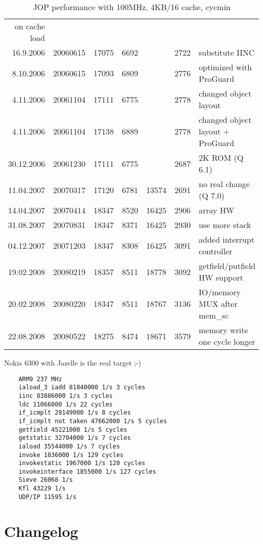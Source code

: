 \documentclass[a4paper,12pt]{scrartcl}
\begin{document}
\begin{table}
\begin{tabular}{rrrrrrl}
        on cache load\\
        16.9.2006 & 20060615 & 17075 & 6692 & & 2722 & substitute
        IINC\\
        8.10.2006 & 20060615 & 17093 & 6809 & & 2776 & optimized
        with ProGuard\\
        4.11.2006 & 20061104 & 17111 & 6775 & & 2778 & changed
        object layout\\
        4.11.2006 & 20061104 & 17138 & 6889 & & 2778 & changed
        object layout + ProGuard\\
        30.12.2006 & 20061230 & 17111 & 6775 & & 2687 & 2K ROM (Q 6.1)\\
        11.04.2007 & 20070317 & 17120 & 6781 & 13574 & 2691 & no real
        change (Q 7.0)\\
        14.04.2007 & 20070414 & 18347 & 8520 & 16425 & 2906 & array HW \\
        31.08.2007 & 20070831 & 18347 & 8371 & 16425 & 2930 & use more stack \\
        04.12.2007 & 20071203 & 18347 & 8308 & 16425 & 3091 & added interrupt controller \\
        19.02.2008 & 20080219 & 18357 & 8511 & 18778 & 3092 & getfield/putfield HW support \\
        20.02.2008 & 20080220 & 18347 & 8511 & 18767 & 3136 & IO/memory MUX after mem\_sc \\
        22.08.2008 & 20080522 & 18275 & 8474 & 18671 & 3579 & memory write one cycle longer \\
        \bottomrule
    \end{tabular}
    \caption{JOP performance with 100MHz, 4KB/16 cache, cycmin}
    \label{tab:perf}

\end{table}
Nokia 6300 with Jazelle is the real target ;-)

\begin{verbatim}
    ARM9 237 MHz
    iaload_3 iadd 81840000 1/s 3 cycles
    iinc 83886000 1/s 3 cycles
    ldc 11066000 1/s 22 cycles
    if_icmplt 28149000 1/s 8 cycles
    if_icmplt not taken 47662000 1/s 5 cycles
    getfield 45221000 1/s 5 cycles
    getstatic 32704000 1/s 7 cycles
    iaload 35544000 1/s 7 cycles
    invoke 1836000 1/s 129 cycles
    invokestatic 1967000 1/s 120 cycles
    invokeinterface 1855000 1/s 127 cycles
    Sieve 26068 1/s
    Kfl 43229 1/s
    UDP/IP 11595 1/s
\end{verbatim}

\section{Changelog}
\end{document}
